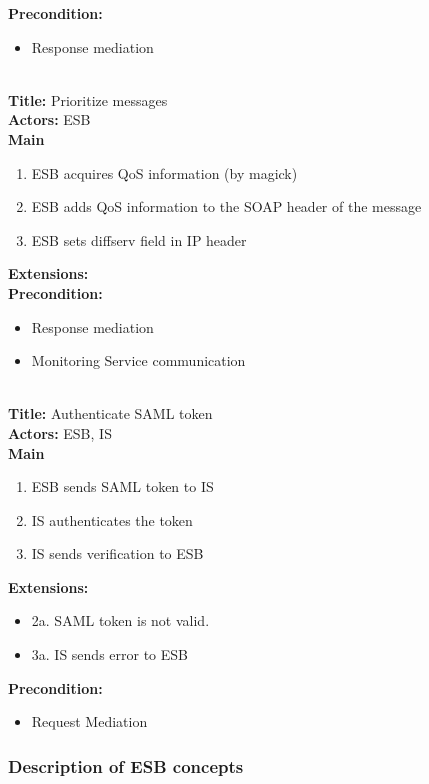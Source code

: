     \textbf{Precondition:}
    \begin{itemize}
        \item Response mediation
    \end{itemize}
    \\
    \textbf{Title:} Prioritize messages\\
    \textbf{Actors:} ESB\\
    \textbf{Main}
    \begin{enumerate}
        \item ESB acquires QoS information (by magick)
        \item ESB adds QoS information to the SOAP header of the message
        \item ESB sets diffserv field in IP header
    \end{enumerate}
    \textbf{Extensions:}\\
    \textbf{Precondition:}
    \begin{itemize}
        \item Response mediation
        \item Monitoring Service communication
    \end{itemize}
    \\
    \textbf{Title:} Authenticate SAML token\\
    \textbf{Actors:} ESB, IS\\
    \textbf{Main}
    \begin{enumerate}
        \item ESB sends SAML token to IS
        \item IS authenticates the token
        \item IS sends verification to ESB
    \end{enumerate}
    \textbf{Extensions:}
    \begin{itemize}
        \item[]	2a. SAML token is not valid.
        \item[]	3a. IS sends error to ESB
    \end{itemize}
    \textbf{Precondition:}
    \begin{itemize}
        \item Request Mediation
    \end{itemize}

    \subsubsection{Description of ESB concepts}\label{Description of ESB concepts} 

